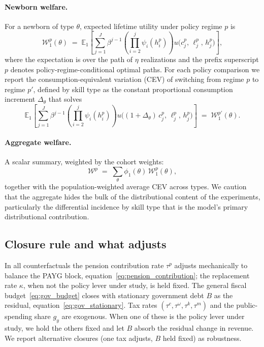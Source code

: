 \documentclass[12pt,a4paper]{article}
\begin{document}
\paragraph{Newborn welfare.} For a newborn of type $\theta$, expected lifetime utility under policy regime $p$ is
\begin{equation}
\label{eq:welfare_newborn}
\mathcal{W}^p_1(\theta)
\;=\;
\mathbb{E}_1\!\left[\sum_{j=1}^{J} \beta^{j-1}
\left(\prod_{i=2}^{j} \psi_i(h_i^p)\right)
u\bigl(c_j^p,\, \ell_j^p,\, h_j^p\bigr)\right],
\end{equation}
where the expectation is over the path of $\eta$ realizations and the prefix superscript $p$ denotes policy-regime-conditional optimal paths. For each policy comparison we report the consumption-equivalent variation (CEV) of switching from regime $p$ to regime $p'$, defined by skill type as the constant proportional consumption increment $\Delta_\theta$ that solves
\begin{equation}
\label{eq:cev_newborn}
\mathbb{E}_1\!\left[\sum_{j=1}^{J} \beta^{j-1}
\left(\prod_{i=2}^{j} \psi_i(h_i^p)\right)
u\bigl((1 + \Delta_\theta)\, c_j^p,\, \ell_j^p,\, h_j^p\bigr)\right]
\;=\;
\mathcal{W}^{p'}_1(\theta).
\end{equation}


\paragraph{Aggregate welfare.} A scalar summary, weighted by the cohort weights:
\begin{equation}
\label{eq:welfare_agg}
\mathcal{W}^p \;=\; \sum_\theta \phi_1(\theta)\, \mathcal{W}^p_1(\theta),
\end{equation}
together with the population-weighted average CEV across types. We caution that the aggregate hides the bulk of the distributional content of the experiments, particularly the differential incidence by skill type that is the model's primary distributional contribution.
 
\subsection{Closure rule and what adjusts}
\label{subsec:policy_closure}
 
In all counterfactuals the pension contribution rate $\tau^p$ adjusts mechanically to balance the PAYG block, equation~\eqref{eq:pension_contribution}; the replacement rate $\kappa$, when not the policy lever under study, is held fixed. The general fiscal budget~\eqref{eq:gov_budget} closes with stationary government debt $B$ as the residual, equation~\eqref{eq:gov_stationary}. Tax rates $(\tau^c, \tau^\omega, \tau^k, \tau^m)$ and the public-spending share $g_y$ are exogenous. When one of these is the policy lever under study, we hold the others fixed and let $B$ absorb the residual change in revenue. We report alternative closures (one tax adjusts, $B$ held fixed) as robustness.
\end{document}
